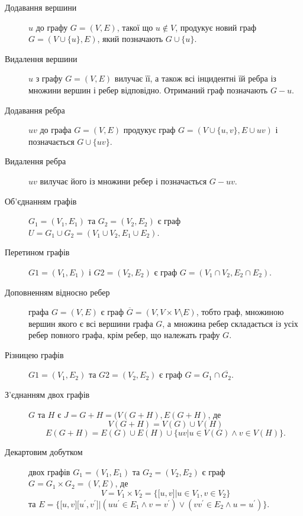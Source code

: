 \begin{description}
\item[Додавання вершини] $u$ до графу $G=(V,E)$, такої що $u \not\in V$, продукує новий граф $G=(V \cup \lbrace u \rbrace,E)$, який позначають $G \cup \lbrace u \rbrace$.
\item[Видалення вершини] $u$ з графу $G=(V,E)$ вилучає її, а також всі інцидентні їй ребра із множини вершин і ребер відповідно. Отриманий граф позначають $G-u$.
\item[Додавання ребра] $uv$ до графа $G=(V,E)$ продукує граф $G=(V \cup \lbrace u,v \rbrace, E \cup uv)$ і позначається $G \cup \lbrace uv \rbrace$.
\item[Видалення ребра] $uv$ вилучає його із множини ребер і позначається $G-uv$.
\item[Об'єднанням графів] $G_1=(V_1,E_1)$ та $G_2=(V_2,E_2)$ є граф $U=G_1 \cup G_2=(V_1 \cup V_2,E_1 \cup E_2)$.
\item[Перетином графів] $G1=(V_1,E_1)$ і $G2=(V_2,E_2)$ є граф $G=(V_1 \cap V_2, E_2 \cap E_2)$.
\item[Доповненням відносно ребер] графа $G=(V,E)$ є граф $\overline G=(V,V \times V \setminus E)$, тобто граф, множиною вершин якого є всі вершини графа $G$, а множина ребер складається із усіх ребер повного графа, крім ребер, що належать графу $G$.
\item[Різницею графів] $G1=(V_1,E_2)$ та $G2=(V_2,E_2)$ є граф $G=G_1 \cap \overline{G_2}$.
\item[З'єднанням двох графів] $G$ та $H$ є $J=G+H=(V(G+H),E(G+H)$, де $$V(G+H)=V(G) \cup V(H)$$ $$E(G+H)=E(G) \cup E(H) \cup \lbrace uv \vert u \in V(G) \land v \in V(H) \rbrace.$$
\item[Декартовим добутком] двох графів $G_1=(V_1,E_1)$ та $G_2=(V_2,E_2)$ є граф $G=G_1 \times G_2=(V,E)$, де $$V=V_1 \times V_2=\lbrace \lbrack u,v \rbrack \vert u \in V_1, v \in V_2 \rbrace$$ та $E=\lbrace \lbrack u,v \rbrack \lbrack u^\prime,v^\prime \rbrack \vert (uu^\prime \in E_1 \land v=v^\prime) \lor (vv^\prime \in E_2 \land u=u^\prime) \rbrace.$
\end{description}
